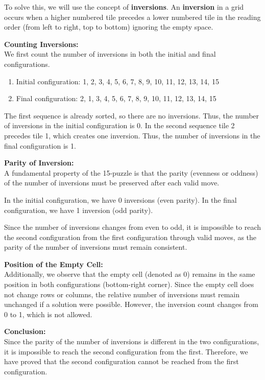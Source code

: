 \begin{flushleft}
    To solve this, we will use the concept of \textbf{inversions}. An \textbf{inversion} in a grid occurs when a higher numbered tile precedes a lower numbered tile in the reading order (from left to right, top to bottom) ignoring the empty space.

\textbf{Counting Inversions:}\\
    We first count the number of inversions in both the initial and final configurations.
    \begin{enumerate}
        \item Initial configuration:  1, 2, 3, 4, 5, 6, 7, 8, 9, 10, 11, 12, 13, 14, 15
        \item Final configuration: 2, 1, 3, 4, 5, 6, 7, 8, 9, 10, 11, 12, 13, 14, 15
    \end{enumerate}

    The first sequence is already sorted, so there are no inversions. Thus, the number of inversions in the initial configuration is 0. In the second sequence tile 2 precedes tile 1, which creates one inversion. Thus, the number of inversions in the final configuration is 1.

\textbf{Parity of Inversion:}\\
    A fundamental property of the 15-puzzle is that the parity (evenness or oddness) of the number of inversions must be preserved after each valid move.

    In the initial configuration, we have 0 inversions (even parity). In the final configuration, we have 1 inversion (odd parity).

    Since the number of inversions changes from even to odd, it is impossible to reach the second configuration from the first configuration through valid moves, as the parity of the number of inversions must remain consistent.

\textbf{Position of the Empty Cell:}\\
    Additionally, we observe that the empty cell (denoted as 0) remains in the same position in both configurations (bottom-right corner). Since the empty cell does not change rows or columns, the relative number of inversions must remain unchanged if a solution were possible. However, the inversion count changes from 0 to 1, which is not allowed.

\textbf{Conclusion:}\\
    Since the parity of the number of inversions is different in the two configurations, it is impossible to reach the second configuration from the first. Therefore, we have proved that the second configuration cannot be reached from the first configuration.
\end{flushleft}